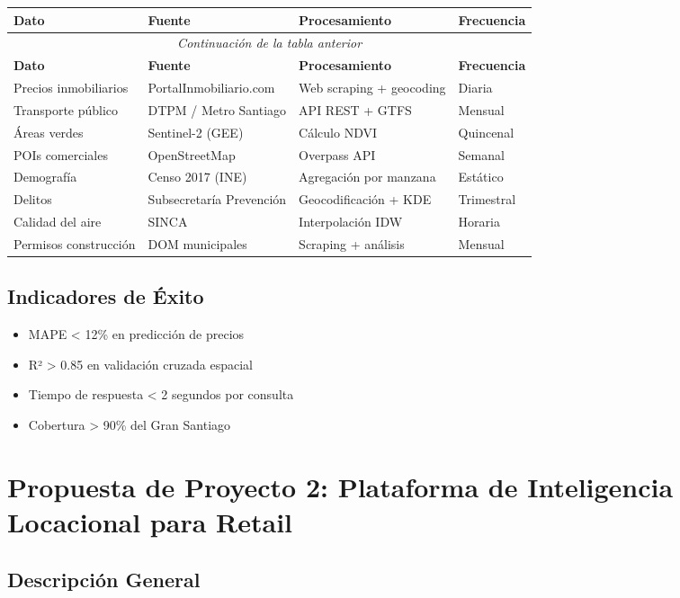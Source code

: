 \documentclass[12pt,a4paper]{article}
\begin{document}
\begin{longtable}{|p{4cm}|p{4cm}|p{4cm}|p{3cm}|}
\hline
\textbf{Dato} & \textbf{Fuente} & \textbf{Procesamiento} & \textbf{Frecuencia} \\
\hline
\endfirsthead
\multicolumn{4}{c}{\textit{Continuación de la tabla anterior}} \\
\hline
\textbf{Dato} & \textbf{Fuente} & \textbf{Procesamiento} & \textbf{Frecuencia} \\
\hline
\endhead

Precios inmobiliarios & PortalInmobiliario.com & Web scraping + geocoding & Diaria \\
\hline
Transporte público & DTPM / Metro Santiago & API REST + GTFS & Mensual \\
\hline
Áreas verdes & Sentinel-2 (GEE) & Cálculo NDVI & Quincenal \\
\hline
POIs comerciales & OpenStreetMap & Overpass API & Semanal \\
\hline
Demografía & Censo 2017 (INE) & Agregación por manzana & Estático \\
\hline
Delitos & Subsecretaría Prevención & Geocodificación + KDE & Trimestral \\
\hline
Calidad del aire & SINCA & Interpolación IDW & Horaria \\
\hline
Permisos construcción & DOM municipales & Scraping + análisis & Mensual \\
\hline
\end{longtable}

\subsection{Indicadores de Éxito}

\begin{itemize}
    \item MAPE < 12\% en predicción de precios
    \item R² > 0.85 en validación cruzada espacial
    \item Tiempo de respuesta < 2 segundos por consulta
    \item Cobertura > 90\% del Gran Santiago
\end{itemize}

\section{Propuesta de Proyecto 2: Plataforma de Inteligencia Locacional para Retail}

\subsection{Descripción General}
\end{document}
